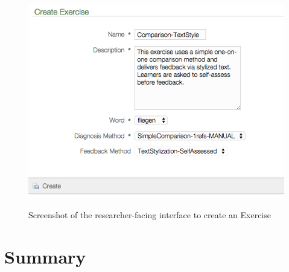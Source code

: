 	
	\begin{figure}
		\centering
		\caption[Creating an Exercise]{Screenshot of the researcher-facing interface to create an Exercise}
		\includegraphics[width=\textwidth]{img/screenshots/createExercise}
		\label{fig:diag:createexercise}
	\end{figure}

\section{Summary}
\label{sec:diag:summary}


	\TODO{}